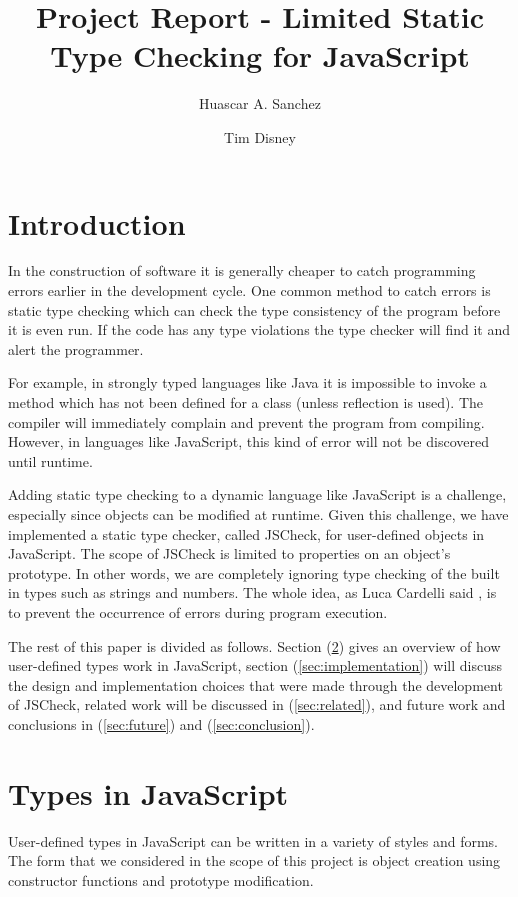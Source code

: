 \documentclass{article}
\begin{document}
\title{Project Report - Limited Static Type Checking for JavaScript}
\author{Huascar A. Sanchez \and Tim Disney}

\maketitle

\lstset{showstringspaces=false}

\section{Introduction}
In the construction of software it is generally cheaper to 
catch programming errors earlier in the development cycle. One common method 
to catch errors is static type checking which can
check the type consistency of the program before it is even
run. If the code has any type violations the type checker will 
find it and alert the programmer.

For example, in strongly typed languages like Java it is impossible 
to invoke a method which has not been defined for a class (unless reflection is used).
The compiler will immediately 
complain and prevent the program from compiling. However, in languages like 
JavaScript, this kind of error will not be discovered until runtime.

Adding static type checking to a dynamic language like JavaScript is a 
challenge, especially since objects can be modified at runtime. Given this challenge, 
we have implemented a static type checker, called JSCheck, for user-defined objects 
in JavaScript. The scope of JSCheck is limited to properties on an object's
prototype. In other words, we are completely ignoring type checking of the built in types
such as strings and numbers. The whole idea, as Luca Cardelli said \cite{typesystems}, 
is to prevent the occurrence of errors during program execution. 

The rest of this paper is divided as follows. Section (\ref{sec:types}) gives an overview
of how user-defined types work in JavaScript, section (\ref{sec:implementation}) 
will discuss the design and implementation choices that were made through the development 
of JSCheck, related work will be discussed in (\ref{sec:related}), and future work
and conclusions in (\ref{sec:future}) and (\ref{sec:conclusion}).


\section{Types in JavaScript}
\label{sec:types}
User-defined types in JavaScript can be written in a variety of styles and forms. The form
that we considered in the scope of this project is object creation using 
constructor functions and prototype modification.
\end{document}
